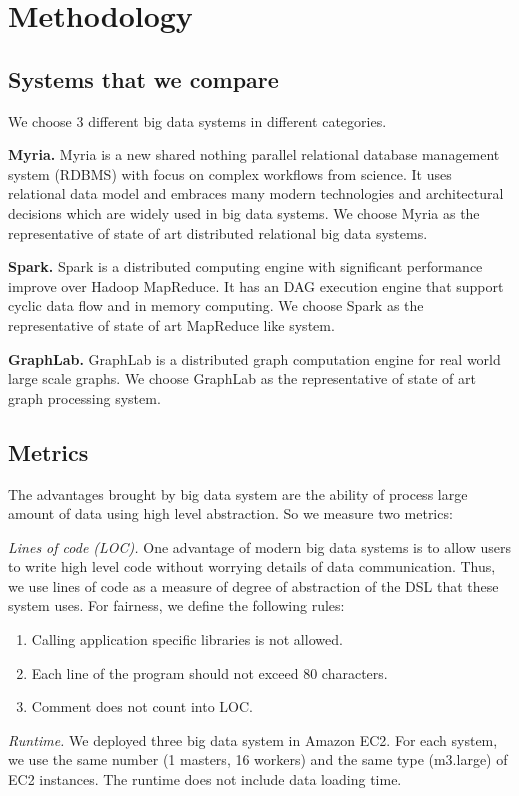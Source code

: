 \section{Methodology}
    
\subsection{Systems that we compare}
We choose 3 different big data systems in different categories. 

\textbf{Myria.} Myria 
\cite{HalperinACCKMORWWXBHS14SIGMOD, myriaurl} is a 
new shared nothing parallel relational database management system (RDBMS) 
with focus on complex workflows from science. It uses relational data model
and embraces many modern technologies and architectural decisions which are 
widely used in big data systems. We choose Myria as the 
representative of state of art distributed relational big data systems.

\textbf{Spark.} Spark \cite{ZahariaCDDMMFSS12NSDI} is a distributed 
computing engine with significant
performance improve over Hadoop MapReduce. It has an DAG execution
engine that support cyclic data flow and in memory computing. We choose Spark 
as the representative of state of art MapReduce like system.


\textbf{GraphLab.} GraphLab \cite{GonzalezLGBG12OSDI} is a distributed graph 
computation engine for real world large scale graphs. We choose GraphLab
as the representative of state of art graph processing system.

\subsection{Metrics}

The advantages brought by big data system are the ability of process large 
amount of data using high level abstraction. So we measure two metrics:

\emph{Lines of code (LOC).} One advantage of modern big data systems 
is to allow users to write high level code without worrying details of 
data communication. Thus, we use lines of code as a measure of degree
of abstraction of the DSL that these system uses. For fairness, we 
define the following rules:
\begin{enumerate}
    \item Calling application specific libraries is not allowed. 
    \item Each line of the program should not exceed 80 characters.
    \item Comment does not count into LOC. 
\end{enumerate}

\emph{Runtime.} We deployed three big data system in Amazon EC2. 
For each system,
we use the same number (1 masters, 16 workers) and the same type (m3.large)
of EC2 instances. The runtime does not include data loading time. 
